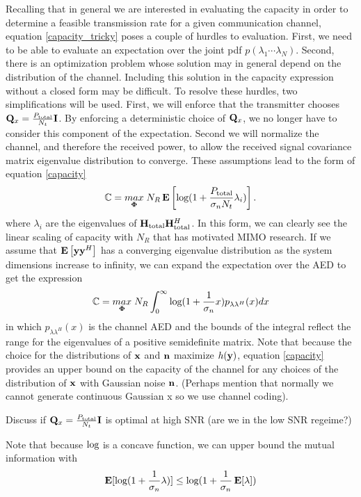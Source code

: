 Recalling that in general we are interested in evaluating the capacity in order to determine a feasible transmission rate for a given communication channel, equation \eqref{capacity_tricky} poses a couple of hurdles to evaluation. First, we need to be able to evaluate an expectation over the joint pdf $p(\lambda_1 \cdots	 \lambda_N)$. Second, there is an optimization problem whose solution may in general depend on the distribution of the channel. Including this solution in the capacity expression without a closed form may be difficult.
To resolve these hurdles, two simplifications will be used.
First, we will enforce that the transmitter chooses $\mathbf{Q}_x = \frac{P_{\text{total}}}{N_t}\mathbf{I}$. 
By enforcing a deterministic choice of $\mathbf{Q}_x$, we no longer have to consider this component of the expectation.
Second we will normalize the channel, and therefore the received power, to allow the received signal covariance matrix eigenvalue distribution to converge. 
These assumptions lead to the form of equation \eqref{capacity}
\begin{equation}\label{no_csi_capacity}
\mathbb{C} = \underset{\boldsymbol{\Phi}}{\mathop{max}} \; N_R \mathop{\bf E{}} \left[\text{log{}}(1 + \frac{P_{\text{total}}}{\sigma_nN_t}\lambda_i)\right].
\end{equation}
where $\lambda_i$ are the eigenvalues of $\mathbf{H}_\text{total} \mathbf{H}_\text{total}^H$.
In this form, we can clearly see the linear scaling of capacity with $N_R$ that has motivated MIMO research.
If we assume that $\mathop{\bf E{}}\left[ \mathbf{y} \mathbf{y}^H \right]$ has a converging eigenvalue distribution as the system dimensions increase to infinity, we can expand the expectation over the AED to get the expression
\begin{equation}\label{no_csi_capacity_aed}
\mathbb{C} = \underset{\boldsymbol{\Phi}}{\mathop{max}} \; N_R  \int_{0}^{\infty}\text{log{}}(1 + \frac{1}{\sigma_n}x)p_{\lambda\lambda^H}(x) dx
\end{equation}
in which $p_{\lambda\lambda^H}(x)$ is the channel AED and the bounds of the integral reflect the range for the eigenvalues of a positive semidefinite matrix.
Note that because the choice for the distributions of $\mathbf{x}$ and $\mathbf{n}$ maximize $h(\mathbf{y})$, equation \eqref{capacity} provides an upper bound on the capacity of the channel for any choices of the distribution of $\mathbf{x} $ with Gaussian noise $\mathbf{n}$. (Perhaps mention that normally we cannot generate continuous Gaussian x so we use channel coding).
\par
Discuss if $\mathbf{Q}_x = \frac{P_{\text{total}}}{N_t}\mathbf{I}$ is optimal at high SNR (are we in the low SNR regeime?)
\par
Note that because $\text{log{}}$ is a concave function, we can upper bound the mutual information with
\begin{equation}\label{mut_inf}
\mathop{\bf E{}}[\text{log{}}(1 + \frac{1}{\sigma_n}\lambda)] \leq \text{log{}}(1 + \frac{1}{\sigma_n}\mathop{\bf E{}}[\lambda])
\end{equation}